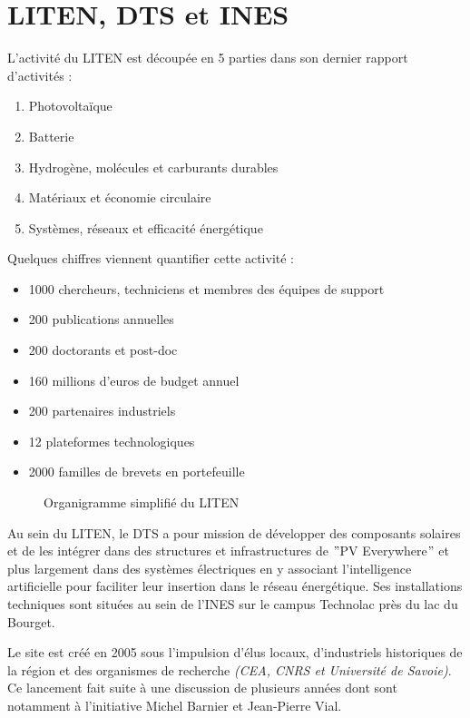 \chapter{LITEN, DTS et INES}\label{ch:liten-dts-et-ines}

L'activité du \gls{LITEN} est découpée en 5 parties dans son dernier rapport d'activités\cite{CEA_prez_LITEN} :
\begin{enumerate}
    \item Photovoltaïque
    \item Batterie
    \item Hydrogène, molécules et carburants durables
    \item Matériaux et économie circulaire
    \item Systèmes, réseaux et efficacité énergétique
\end{enumerate}

Quelques chiffres viennent quantifier cette activité :
\begin{itemize}
    \item 1000 chercheurs, techniciens et membres des équipes de support
    \item 200 publications annuelles
    \item 200 doctorants et post-doc
    \item 160 millions d'euros de budget annuel
    \item 200 partenaires industriels
    \item 12 plateformes technologiques
    \item 2000 familles de brevets en portefeuille
\end{itemize}

\begin{figure}[H]
    \centering
    \fbox{\scalebox{0.9}{}}
    \caption{Organigramme simplifié du LITEN}
    \label{fig:organigramme-LITEN}
\end{figure}

Au sein du \gls{LITEN}, le \gls{DTS} a pour mission de développer des composants solaires et de les intégrer dans des structures et infrastructures de \("\)PV Everywhere\("\) et plus largement dans des systèmes électriques en y associant l'intelligence artificielle pour faciliter leur insertion dans le réseau énergétique.
Ses installations techniques sont situées au sein de l'\gls{INES} sur le campus Technolac près du lac du Bourget.

Le site est créé en 2005 sous l'impulsion d'élus locaux, d'industriels historiques de la région et des organismes de recherche \textit{(CEA, CNRS et Université de Savoie)}.
Ce lancement fait suite à une discussion de plusieurs années dont sont notamment à l'initiative Michel Barnier et Jean-Pierre Vial.

